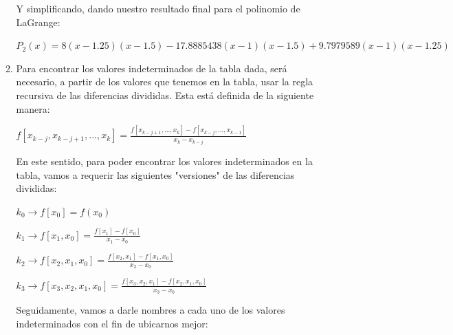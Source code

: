 \documentclass[english,notitlepage,letterpaper, 10pt]{article} %
\begin{document}
\begin{enumerate}
\begin{enumerate}
      Y simplificando, dando nuestro resultado final para el polinomio de LaGrange:

      \begin{center}
        \begin{math}
          P_2(x) = 8 (x-1.25)(x-1.5) - 17.8885438 (x-1)(x-1.5)  + 9.7979589 (x-1)(x-1.25) 
        \end{math}
      \end{center}

      \item Para encontrar los valores indeterminados de la tabla dada, será necesario, a partir de los valores que tenemos en la tabla, usar la regla recursiva de las diferencias divididas. Esta está definida de la siguiente manera:
      
      \begin{center}
        \begin{math}
          f[x_{k-j},x_{k-j+1}, ..., x_{k}] = \displaystyle \frac{ f[x_{k-j+1}, ..., x_{k}]- f[x_{k-j}, ..., x_{k-1}]}{x_k-x_{k-j}}
        \end{math}
      \end{center}

      En este sentido, para poder encontrar los valores indeterminados en la tabla, vamos a requerir las siguientes "versiones" de las diferencias divididas:

      \begin{center}
        \begin{math}
          k_0 \rightarrow f[x_0] = f(x_0)
        \end{math}

        \begin{math}
          k_1 \rightarrow f[x_1,x_0] = \displaystyle \frac{f[x_1]-f[x_0]}{x_1 - x_0}
        \end{math}

        \begin{math}
          k_2 \rightarrow f[x_2,x_1,x_0] = \displaystyle \frac{f[x_2,x_1]-f[x_1,x_0]}{x_2 - x_0}
        \end{math}

        \begin{math}
          k_3 \rightarrow f[x_3,x_2,x_1,x_0] = \displaystyle \frac{f[x_3,x_2,x_1] - f[x_2,x_1,x_0]}{x_3 - x_0}
        \end{math}

      Seguidamente, vamos a darle nombres a cada uno de los valores indeterminados con el fin de ubicarnos mejor:


\end{center}
\end{enumerate}
\end{enumerate}
\end{document}
